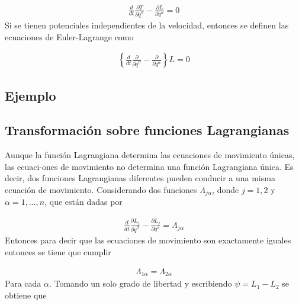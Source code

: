 \begin{gather*}
    \frac{d}{dt}  \frac{\partial T}{\partial \dot{q}^{\alpha}} -\frac{\partial L}{\partial q^{\alpha}} = 0
\end{gather*}
Si se tienen potenciales independientes de la velocidad, entonces se definen las ecuaciones de Euler-Lagrange como 

\begin{gather*}
    \left\{\frac{d}{dt}  \frac{\partial }{\partial \dot{q}^{\alpha}} -\frac{\partial }{\partial q^{\alpha}}\right\} L  = 0
\end{gather*}

\subsection{Ejemplo}

\subsection[short]{Transformación sobre funciones Lagrangianas}

Aunque la función Lagrangiana determina las ecuaciones de movimiento únicas, las ecuaci-\newline ones de movimiento no determina una función Lagrangiana única. Es decir, dos funciones Lagrangianas diferentes pueden conducir a una misma ecuación de movimiento. Considerando dos funciones $\Lambda_{j\alpha}$, donde $j = 1, 2$ y $\alpha = 1, \dots, n$, que están dadas por

\begin{gather*}
    \frac{d}{dt}\frac{\partial L_j}{\partial \dot{q}^{\alpha}} - \frac{\partial L_j}{\partial q^{\alpha}} = \Lambda_{j\alpha}
\end{gather*}
Entonces para decir que las ecuaciones de movimiento son exactamente iguales entonces se tiene que cumplir 

\begin{gather*}
    \Lambda_{1\alpha} = \Lambda_{2\alpha}
\end{gather*}
Para cada $\alpha$. Tomando un solo grado de libertad y escribiendo $\psi = L_1 - L_2$ se obtiene que

